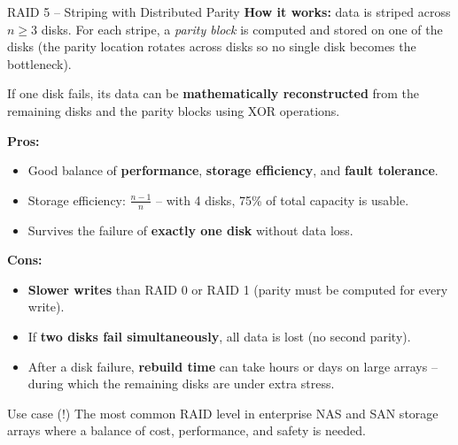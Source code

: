 \begin{frame}{RAID 5 -- Striping with Distributed Parity}
  \textbf{How it works:} data is striped across $n \geq 3$ disks. For each stripe, a \emph{parity
  block} is computed and stored on one of the disks (the parity location rotates across disks so no
  single disk becomes the bottleneck).

  \medskip
  If one disk fails, its data can be \textbf{mathematically reconstructed} from the remaining
  disks and the parity blocks using XOR operations.

  \medskip
  \textbf{Pros:}
  \begin{itemize}
    \item Good balance of \textbf{performance}, \textbf{storage efficiency}, and
          \textbf{fault tolerance}.
    \item Storage efficiency: $\frac{n-1}{n}$ -- with 4 disks, 75\% of total capacity is usable.
    \item Survives the failure of \textbf{exactly one disk} without data loss.
  \end{itemize}

  \textbf{Cons:}
  \begin{itemize}
    \item \textbf{Slower writes} than RAID 0 or RAID 1 (parity must be computed for every write).
    \item If \textbf{two disks fail simultaneously}, all data is lost (no second parity).
    \item After a disk failure, \textbf{rebuild time} can take hours or days on large arrays --
          during which the remaining disks are under extra stress.
  \end{itemize}

  \begin{block}{Use case (!)}
    The most common RAID level in enterprise NAS and SAN storage arrays where a balance of cost,
    performance, and safety is needed.
  \end{block}
\end{frame}

